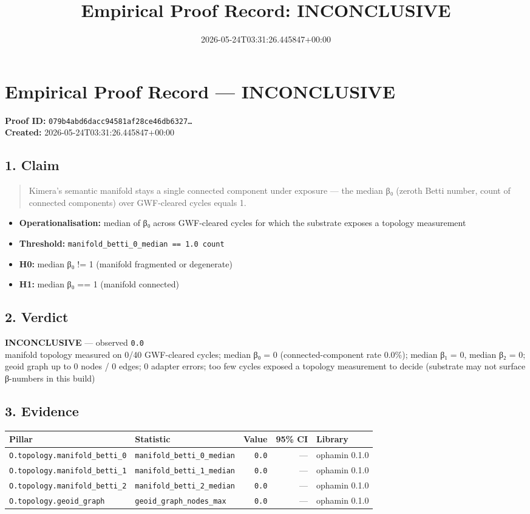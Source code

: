 \documentclass{article}
\title{Empirical Proof Record: INCONCLUSIVE}
\date{2026-05-24T03:31:26.445847+00:00}
\begin{document}
\maketitle
\section*{Empirical Proof Record --- \textcolor{inconclusive}{\textbf{INCONCLUSIVE}}}
\textbf{Proof ID:} \texttt{079b4abd6dacc94581af28ce46db6327\dots}\\
\textbf{Created:} 2026-05-24T03:31:26.445847+00:00
\subsection*{1. Claim}
\begin{quote}Kimera's semantic manifold stays a single connected component under exposure — the median β₀ (zeroth Betti number, count of connected components) over GWF-cleared cycles equals 1.\end{quote}
\begin{itemize}
\item \textbf{Operationalisation:} median of β₀ across GWF-cleared cycles for which the substrate exposes a topology measurement
\item \textbf{Threshold:} \texttt{manifold\_betti\_0\_median == 1.0 count}
\item \textbf{H0:} median β₀ != 1 (manifold fragmented or degenerate)
\item \textbf{H1:} median β₀ == 1 (manifold connected)
\end{itemize}
\subsection*{2. Verdict}
\textcolor{inconclusive}{\textbf{INCONCLUSIVE}} --- observed \texttt{0.0}\\
manifold topology measured on 0/40 GWF-cleared cycles; median β₀ = 0 (connected-component rate 0.0\%); median β₁ = 0, median β₂ = 0; geoid graph up to 0 nodes / 0 edges; 0 adapter errors; too few cycles exposed a topology measurement to decide (substrate may not surface β-numbers in this build)
\subsection*{3. Evidence}
\begin{tabular}{llrrl}\toprule
\textbf{Pillar} & \textbf{Statistic} & \textbf{Value} & \textbf{95\% CI} & \textbf{Library} \\\midrule
\texttt{O.topology.manifold\_betti\_0} & \texttt{manifold\_betti\_0\_median} & \texttt{0.0} & --- & ophamin 0.1.0 \\
\texttt{O.topology.manifold\_betti\_1} & \texttt{manifold\_betti\_1\_median} & \texttt{0.0} & --- & ophamin 0.1.0 \\
\texttt{O.topology.manifold\_betti\_2} & \texttt{manifold\_betti\_2\_median} & \texttt{0.0} & --- & ophamin 0.1.0 \\
\texttt{O.topology.geoid\_graph} & \texttt{geoid\_graph\_nodes\_max} & \texttt{0.0} & --- & ophamin 0.1.0 \\
\bottomrule\end{tabular}
\end{document}
